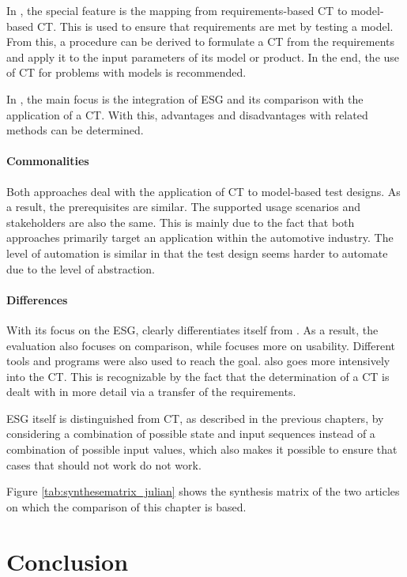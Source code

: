 In \cite{Conrad}, the special feature is the mapping from requirements-based CT to model-based CT. This is used to ensure that requirements are met by testing a model. From this, a procedure can be derived to formulate a CT from the requirements and apply it to the input parameters of its model or product. In the end, the use of CT for problems with models is recommended. 

In \cite{Belli}, the main focus is the integration of ESG and its comparison with the application of a CT. With this, advantages and disadvantages with related methods can be determined.

\paragraph{Commonalities}

Both approaches deal with the application of CT to model-based test designs. As a result, the prerequisites are similar. The supported usage scenarios and stakeholders are also the same. This is mainly due to the fact that both approaches primarily target an application within the automotive industry. The level of automation is similar in that the test design seems harder to automate due to the level of abstraction.

\paragraph{Differences}

With its focus on the ESG, \cite{Belli} clearly differentiates itself from \cite{Conrad}. As a result, the evaluation also focuses on comparison, while \cite{Conrad} focuses more on usability. Different tools and programs were also used to reach the goal. \cite{Conrad} also goes more intensively into the CT. This is recognizable by the fact that the determination of a CT is dealt with in more detail via a transfer of the requirements.

ESG itself is distinguished from CT, as described in the previous chapters, by considering a combination of possible state and input sequences instead of a combination of possible input values, which also makes it possible to ensure that cases that should not work do not work.

Figure \autoref{tab:synthesematrix_julian} shows the synthesis matrix of the two articles on which the comparison of this chapter is based. 

\section{Conclusion}
\label{Kap:Conclusion}

